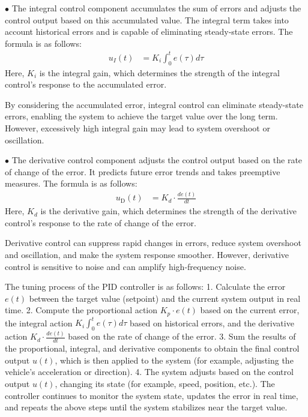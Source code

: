 $\bullet$ The integral control component accumulates the sum of errors and adjusts the control output based on this accumulated value. 
The integral term takes into account historical errors and is capable of eliminating steady-state errors. 
The formula is as follows:
\begin{align}
	u_{I}(t) & = K_{i} \int_{0}^{t} e(\tau) d \tau
\end{align}
Here, $K_{i}$ is the integral gain, which determines the strength of the integral control's response to the accumulated error. 

By considering the accumulated error, integral control can eliminate steady-state errors, enabling the system to achieve the target value over the long term. 
However, excessively high integral gain may lead to system overshoot or oscillation.

$\bullet$ The derivative control component adjusts the control output based on the rate of change of the error. 
It predicts future error trends and takes preemptive measures. 
The formula is as follows:
\begin{align}
	u_{\mathrm{D}}(t) & = K_{d} \cdot \frac{d e(t)}{d t}
\end{align}
Here, $K_{d}$ is the derivative gain, which determines the strength of the derivative control's response to the rate of change of the error.

Derivative control can suppress rapid changes in errors, reduce system overshoot and oscillation, and make the system response smoother. 
However, derivative control is sensitive to noise and can amplify high-frequency noise.


The tuning process of the PID controller is as follows:  
1. Calculate the error $e(t)$ between the target value (setpoint) and the current system output in real time.  
2. Compute the proportional action $K_{p} \cdot e(t)$ based on the current error, the integral action $K_{i} \int_{0}^{t} e(\tau) d \tau$ based on historical errors, and the derivative action $K_{d} \cdot \frac{d e(t)}{d t}$ based on the rate of change of the error.  
3. Sum the results of the proportional, integral, and derivative components to obtain the final control output $u(t)$, which is then applied to the system (for example, adjusting the vehicle's acceleration or direction). 
4. The system adjusts based on the control output $u(t)$, changing its state (for example, speed, position, etc.). 
The controller continues to monitor the system state, updates the error in real time, and repeats the above steps until the system stabilizes near the target value.



